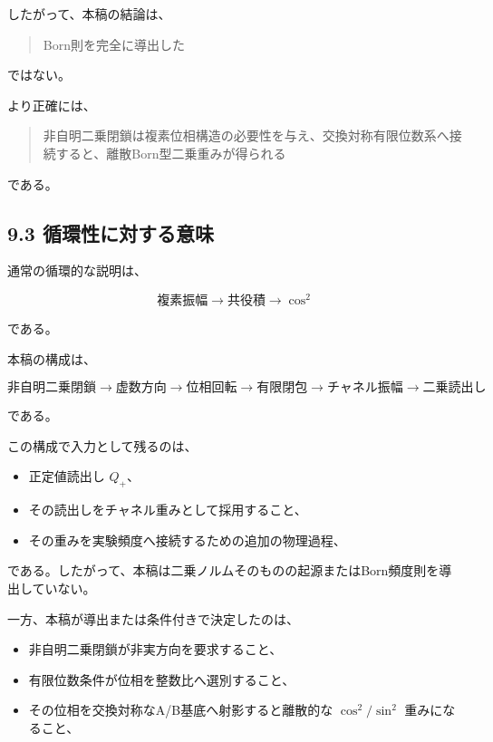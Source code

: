 \documentclass[
  a4paper,
  10pt]{article}
\providecommand{\tightlist}{%
  \setlength{\itemsep}{0pt}\setlength{\parskip}{0pt}}
\begin{document}
したがって、本稿の結論は、

\begin{quote}
Born則を完全に導出した
\end{quote}

ではない。

より正確には、

\begin{quote}
非自明二乗閉鎖は複素位相構造の必要性を与え、交換対称有限位数系へ接続すると、離散Born型二乗重みが得られる
\end{quote}

である。

\subsection{9.3
循環性に対する意味}\label{93-ux5faaux74b0ux6027ux306bux5bfeux3059ux308bux610fux5473}

通常の循環的な説明は、

\[
\text{複素振幅}
\rightarrow
\text{共役積}
\rightarrow
\cos^2
\]

である。

本稿の構成は、

\[
\text{非自明二乗閉鎖}
\rightarrow
\text{虚数方向}
\rightarrow
\text{位相回転}
\rightarrow
\text{有限閉包}
\rightarrow
\text{チャネル振幅}
\rightarrow
\text{二乗読出し}
\]

である。

この構成で入力として残るのは、

\begin{itemize}
\tightlist
\item
  正定値読出し \(Q_+\)、
\item
  その読出しをチャネル重みとして採用すること、
\item
  その重みを実験頻度へ接続するための追加の物理過程、
\end{itemize}

である。したがって、本稿は二乗ノルムそのものの起源またはBorn頻度則を導出していない。

一方、本稿が導出または条件付きで決定したのは、

\begin{itemize}
\tightlist
\item
  非自明二乗閉鎖が非実方向を要求すること、
\item
  有限位数条件が位相を整数比へ選別すること、
\item
  その位相を交換対称なA/B基底へ射影すると離散的な \(\cos^2/\sin^2\)
  重みになること、
\end{itemize}
\end{document}
